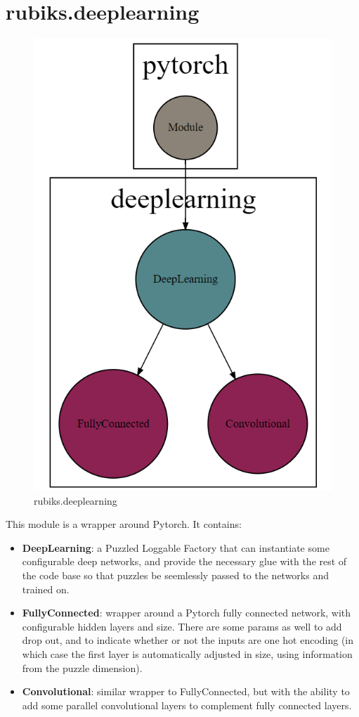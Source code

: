 \section{rubiks.deeplearning}
\begin{figure}[H]
\centering
\includegraphics[scale=0.25]{./Figures/codebasedeeplearning}
\caption[Codebase]{rubiks.deeplearning}
\label{fig:Codebasedeeplearning}
\end{figure}
This module is a wrapper around Pytorch. It contains:
\begin{itemize}
\item \textbf{DeepLearning}: a Puzzled Loggable Factory that can instantiate some configurable deep networks, and provide the necessary glue with the rest of the code base so that puzzles be seemlessly passed to the networks and trained on. 
\item \textbf{FullyConnected}: wrapper around a Pytorch fully connected network, with configurable hidden layers and size. There are some params as well to add drop out, and to indicate whether or not the inputs are one hot encoding (in which case the first layer is automatically adjusted in size, using information from the puzzle dimension).
\item \textbf{Convolutional}: similar wrapper to FullyConnected, but with the ability to add some parallel convolutional layers to complement fully connected layers.
\end{itemize}



